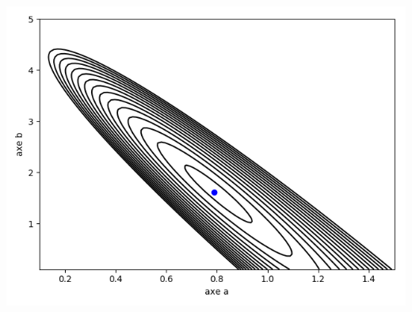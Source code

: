 \documentclass[11pt,class=report,crop=false]{standalone}
\begin{document}
\begin{exemple}
\begin{center}
\includegraphics[scale=\myscale,scale=0.7]{figures/fonctions-regression}
\end{center}

\end{exemple}
\end{document}
